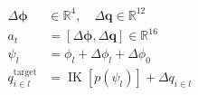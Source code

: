 \documentclass[border=7pt]{standalone}
\begin{document}
\color{ink}
$\displaystyle \begin{aligned}\Delta\boldsymbol\phi&\in\mathbb R^4,\quad\Delta\mathbf q\in\mathbb R^{12}\\a_t&=[\Delta\boldsymbol\phi,\Delta\mathbf q]\in\mathbb R^{16}\\\psi_l&=\phi_l+\Delta\phi_l+\Delta\phi_0\\q_{i\in l}^{\mathrm{target}}&=\operatorname{IK}\!\left[p(\psi_l)\right]+\Delta q_{i\in l}\end{aligned}$
\end{document}
